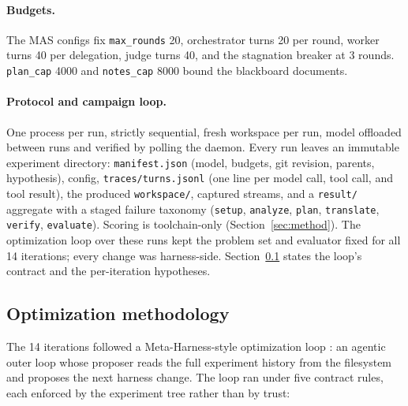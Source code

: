 \documentclass[11pt]{article}
\begin{document}
\paragraph{Budgets.}
The MAS configs fix \texttt{max\_rounds} 20, orchestrator turns 20 per
round, worker turns 40 per delegation, judge turns 40, and the stagnation
breaker at 3 rounds. \texttt{plan\_cap} 4000 and \texttt{notes\_cap} 8000
bound the blackboard documents.

\paragraph{Protocol and campaign loop.}
One process per run, strictly sequential, fresh workspace per run, model
offloaded between runs and verified by polling the daemon. Every run
leaves an immutable experiment directory: \texttt{manifest.json} (model,
budgets, git revision, parents, hypothesis), config,
\texttt{traces/turns.jsonl} (one line per model call, tool call, and tool
result), the produced \texttt{workspace/}, captured streams, and a
\texttt{result/} aggregate with a staged failure taxonomy
(\texttt{setup}, \texttt{analyze}, \texttt{plan}, \texttt{translate},
\texttt{verify}, \texttt{evaluate}). Scoring is toolchain-only
(Section~\ref{sec:method}). The optimization loop over these runs kept
the problem set and evaluator fixed for all 14 iterations; every change
was harness-side. Section~\ref{sec:optmethod} states the loop's
contract and the per-iteration hypotheses.

\subsection{Optimization methodology}
\label{sec:optmethod}

The 14 iterations followed a Meta-Harness-style optimization loop
\cite{metaharness2026}: an agentic outer loop whose proposer reads the
full experiment history from the filesystem and proposes the next
harness change. The loop ran under five contract rules, each enforced
by the experiment tree rather than by trust:
\end{document}
